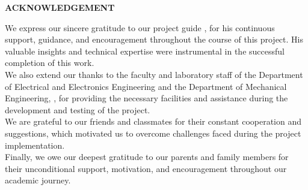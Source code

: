 
\parbox[1in]{4in}{}

\begin{center}
\textbf{\Large ACKNOWLEDGEMENT}
\end{center}

\vspace{1cm}

\noindent
We express our sincere gratitude to our project guide 
\textbf{\guide}, for his continuous support, guidance, and encouragement throughout the course of this project. 
His valuable insights and technical expertise were instrumental in the successful completion of this work.\\[.1cm]

\noindent
We also extend our thanks to the faculty and laboratory staff of the Department of Electrical and Electronics Engineering and the Department of Mechanical Engineering, 
\textbf{\bh}, for providing the necessary facilities and assistance during the development and testing of the project.\\[.1cm]

\noindent
We are grateful to our friends and classmates for their constant cooperation and suggestions, 
which motivated us to overcome challenges faced during the project implementation.\\[.1cm]

\noindent
Finally, we owe our deepest gratitude to our parents and family members for their unconditional support, motivation, and encouragement 
throughout our academic journey.


\vspace{1.5cm}
\begin{flushright}
	{\stone}\\ %
    {\stthree}\\
    {\sttwo}\\
\end{flushright} 

